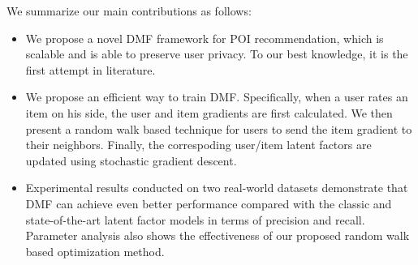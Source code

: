 We summarize our main contributions as follows: 
\begin{itemize}
\item We propose a novel DMF framework for POI recommendation, which is scalable and is able to preserve user privacy. 
To our best knowledge, it is the first attempt in literature. 
\item We propose an efficient way to train DMF. Specifically, when a user rates an item on his side, the user and item gradients are first calculated. We then present a random walk based technique for users to send the item gradient to their neighbors. Finally, the correspoding user/item latent factors are updated using stochastic gradient descent. 
\item Experimental results conducted on two real-world datasets demonstrate that DMF can achieve even better performance compared with the classic and state-of-the-art latent factor models in terms of precision and recall. 
Parameter analysis also shows the effectiveness of our proposed random walk based optimization method. 
\end{itemize}

